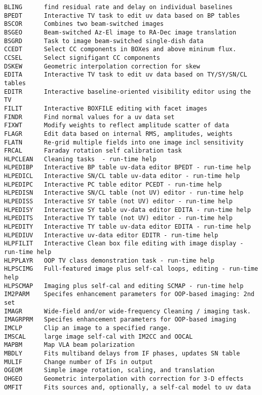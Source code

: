 \vskip 0.5pt
\bbve\begin{verbatim}
BLING      find residual rate and delay on individual baselines
BPEDT      Interactive TV task to edit uv data based on BP tables
BSCOR      Combines two beam-switched images
BSGEO      Beam-switched Az-El image to RA-Dec image translation
BSGRD      Task to image beam-switched single-dish data
CCEDT      Select CC components in BOXes and above mininum flux.
CCSEL      Select signifigant CC components
DSKEW      Geometric interpolation correction for skew
EDITA      Interactive TV task to edit uv data based on TY/SY/SN/CL tables
EDITR      Interactive baseline-oriented visibility editor using the TV
FILIT      Interactive BOXFILE editing with facet images
FINDR      Find normal values for a uv data set
FIXWT      Modify weights to reflect amplitude scatter of data
FLAGR      Edit data based on internal RMS, amplitudes, weights
FLATN      Re-grid multiple fields into one image incl sensitivity
FRCAL      Faraday rotation self calibration task
HLPCLEAN   Cleaning tasks  - run-time help
HLPEDIBP   Interactive BP table uv-data editor BPEDT - run-time help
HLPEDICL   Interactive SN/CL table uv-data editor - run-time help
HLPEDIPC   Interactive PC table editor PCEDT - run-time help
HLPEDISN   Interactive SN/CL table (not UV) editor - run-time help
HLPEDISS   Interactive SY table (not UV) editor - run-time help
HLPEDISY   Interactive SY table uv-data editor EDITA - run-time help
HLPEDITS   Interactive TY table (not UV) editor - run-time help
HLPEDITY   Interactive TY table uv-data editor EDITA - run-time help
HLPEDIUV   Interactive uv-data editor EDITR - run-time help
HLPFILIT   Interactive Clean box file editing with image display - run-time help
HLPPLAYR   OOP TV class demonstration task - run-time help
HLPSCIMG   Full-featured image plus self-cal loops, editing - run-time help
HLPSCMAP   Imaging plus self-cal and editing SCMAP - run-time help
IM2PARM    Specifes enhancement parameters for OOP-based imaging: 2nd set
IMAGR      Wide-field and/or wide-frequency Cleaning / imaging task.
IMAGRPRM   Specifes enhancement parameters for OOP-based imaging
IMCLP      Clip an image to a specified range.
IMSCAL     large image self-cal with IM2CC and OOCAL
MAPBM      Map VLA beam polarization
MBDLY      Fits multiband delays from IF phases, updates SN table
MULIF      Change number of IFs in output
OGEOM      Simple image rotation, scaling, and translation
OHGEO      Geometric interpolation with correction for 3-D effects
OMFIT      Fits sources and, optionally, a self-cal model to uv data

\end{verbatim}
